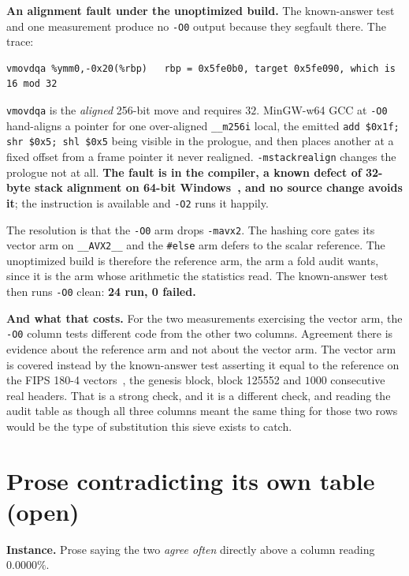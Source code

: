 \textbf{An alignment fault under the unoptimized build.} The known-answer test and one measurement produce no \texttt{-O0} output because they segfault there. The trace:

\begin{verbatim}
vmovdqa %ymm0,-0x20(%rbp)   rbp = 0x5fe0b0, target 0x5fe090, which is 16 mod 32
\end{verbatim}

\texttt{vmovdqa} is the \emph{aligned} 256-bit move and requires \(32\). MinGW-w64 GCC at \texttt{-O0} hand-aligns a pointer for one over-aligned \texttt{\_\_m256i} local, the emitted \texttt{add \$0x1f; shr \$0x5; shl \$0x5} being visible in the prologue, and then places another at a fixed offset from a frame pointer it never realigned. \texttt{-mstackrealign} changes the prologue not at all. \textbf{The fault is in the compiler, a known defect of 32-byte stack alignment on 64-bit Windows~\cite{src:GCC-bug-54412}, and no source change avoids it}; the instruction is available and \texttt{-O2} runs it happily.

The resolution is that the \texttt{-O0} arm drops \texttt{-mavx2}. The hashing core gates its vector arm on \texttt{\_\_AVX2\_\_} and the \texttt{\#else} arm defers to the scalar reference. The unoptimized build is therefore the reference arm, the arm a fold audit wants, since it is the arm whose arithmetic the statistics read. The known-answer test then runs \texttt{-O0} clean: \textbf{24 run, 0 failed.}

\textbf{And what that costs.} For the two measurements exercising the vector arm, the \texttt{-O0} column tests different code from the other two columns. Agreement there is evidence about the reference arm and not about the vector arm. The vector arm is covered instead by the known-answer test asserting it equal to the reference on the FIPS 180-4 vectors~\cite{src:FIPS-180-4}, the genesis block, block 125552 and \(1000\) consecutive real headers. That is a strong check, and it is a different check, and reading the audit table as though all three columns meant the same thing for those two rows would be the type of substitution this sieve exists to catch.

\section{Prose contradicting its own table (open)}

\textbf{Instance.} Prose saying the two \emph{agree often} directly above a column reading \(0.0000\%\).

